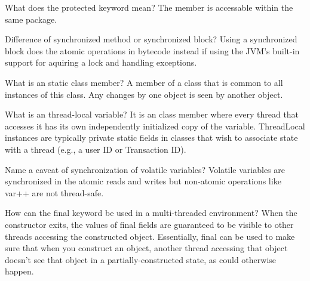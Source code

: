 \begin{flashcard}[Keywords]{What does the protected keyword mean?}
The member is accessable within the same package.
\end{flashcard}

\begin{flashcard}[Concurrency]{Difference of synchronized method or synchronized block?}
Using a synchronized block does the atomic operations in bytecode instead if using the JVM's built-in support for aquiring a lock and handling exceptions.
\end{flashcard}

\begin{flashcard}[Classes]{What is an static class member?}
A member of a class that is common to all instances of this class. Any changes by one object is seen by another object.
\end{flashcard}

\begin{flashcard}[Concurrency]{What is an thread-local variable?}
It is an class member where every thread that accesses it has its own independently initialized copy of the variable. ThreadLocal instances are typically private static fields in classes that wish to associate state with a thread (e.g., a user ID or Transaction ID).
\end{flashcard}

\begin{flashcard}[Concurrency]{Name a caveat of synchronization of volatile variables?}
Volatile variables are synchronized in the atomic reads and writes but non-atomic operations like var++ are not thread-safe.
\end{flashcard}

\begin{flashcard}[Concurrency]{How can the final keyword be used in a multi-threaded environment?}
When the constructor exits, the values of final fields are guaranteed to be visible to other threads accessing the constructed object. Essentially, final can be used to make sure that when you construct an object, another thread accessing that object doesn't see that object in a partially-constructed state, as could otherwise happen.
\end{flashcard}

